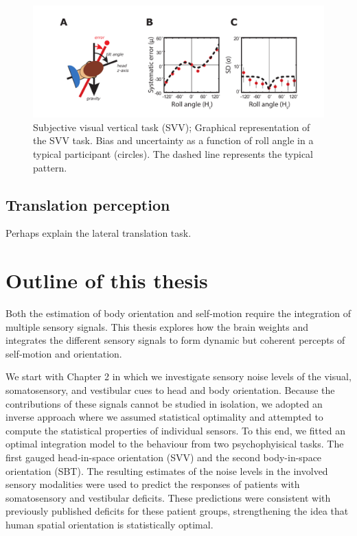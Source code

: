 \begin{figure}
    \includegraphics[width=1.0\textwidth]{src/intro/figures/svv.pdf}

    \caption{Subjective visual vertical task (SVV);  Graphical representation of the SVV task.  Bias and  uncertainty as a function of roll angle in a typical participant (circles). The dashed line represents the typical pattern.}
    \label{intro:fig4}
\end{figure}

\subsection{Translation perception}

Perhaps explain the lateral translation task.


\section{Outline of this thesis}

Both the estimation of body orientation and self-motion require the integration of multiple sensory signals. This thesis explores how the brain weights and integrates the different sensory signals to form dynamic but coherent percepts of self-motion and orientation.

We start with Chapter 2 in which we investigate sensory noise levels of the visual, somatosensory, and vestibular cues to head and body orientation. Because the contributions of these signals cannot be studied in isolation, we adopted an inverse approach where we assumed statistical optimality and attempted to compute the statistical properties of individual sensors. To this end, we fitted an optimal integration model to the behaviour from two psychophyisical tasks. The first gauged head-in-space orientation (SVV) and the second body-in-space orientation (SBT). The resulting estimates of the noise levels in the involved sensory modalities were used to predict the responses of patients with somatosensory and vestibular deficits. These predictions were consistent with previously published deficits for these patient groups, strengthening the idea that human spatial orientation is statistically optimal.


